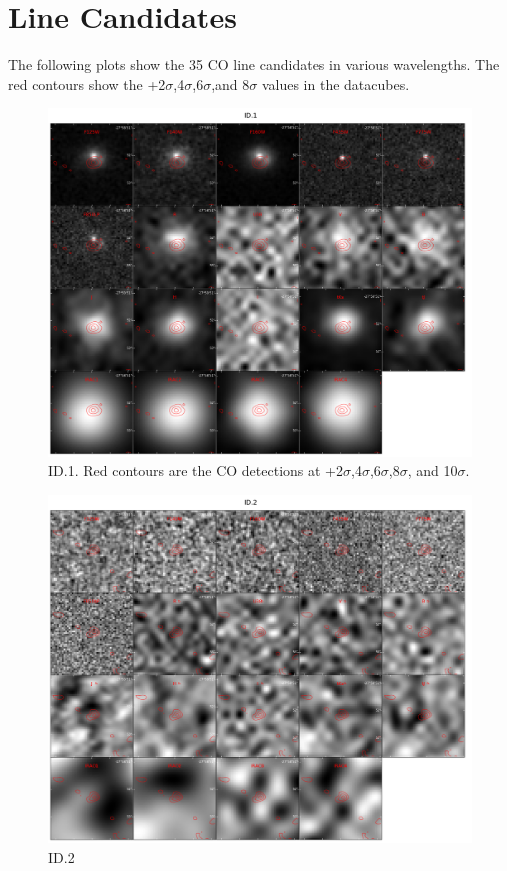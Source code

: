 \section{Line Candidates}\label{sec:A1}

The following plots show the 35 CO line candidates in various wavelengths. The red contours show the  +2$\sigma$,4$\sigma$,6$\sigma$,and 8$\sigma$ values in the datacubes. 

\begin{figure}[tbp]
\centering \includegraphics[width=160mm]{Matched/ASPECS_Cutout_0.jpg}
\caption{ID.1. Red contours are the CO detections at +2$\sigma$,4$\sigma$,6$\sigma$,8$\sigma$, and 10$\sigma$. }
\label{fig:Match_One}
\end{figure}

\begin{figure}[tbp]
\centering \includegraphics[width=160mm]{Matched/ASPECS_Cutout_1.jpg}
\caption{ID.2}
\label{fig:Match_Two}
\end{figure}


